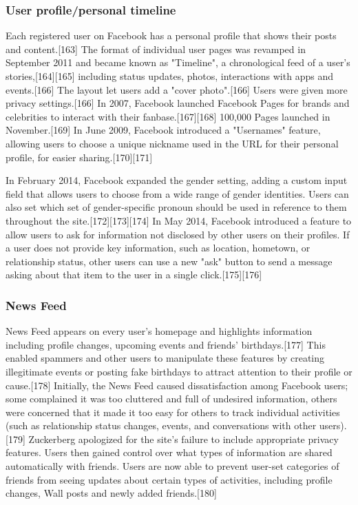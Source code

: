\documentclass[12pt]{article}
\begin{document}
\subsubsection{User profile/personal timeline}



Each registered user on Facebook has a personal profile that shows their posts and content.[163] The format of individual user pages was revamped in September 2011 and became known as "Timeline", a chronological feed of a user's stories,[164][165] including status updates, photos, interactions with apps and events.[166] The layout let users add a "cover photo".[166] Users were given more privacy settings.[166] In 2007, Facebook launched Facebook Pages for brands and celebrities to interact with their fanbase.[167][168] 100,000 Pages launched in November.[169] In June 2009, Facebook introduced a "Usernames" feature, allowing users to choose a unique nickname used in the URL for their personal profile, for easier sharing.[170][171]

In February 2014, Facebook expanded the gender setting, adding a custom input field that allows users to choose from a wide range of gender identities. Users can also set which set of gender-specific pronoun should be used in reference to them throughout the site.[172][173][174] In May 2014, Facebook introduced a feature to allow users to ask for information not disclosed by other users on their profiles. If a user does not provide key information, such as location, hometown, or relationship status, other users can use a new "ask" button to send a message asking about that item to the user in a single click.[175][176] 








\subsubsection{News Feed}



News Feed appears on every user's homepage and highlights information including profile changes, upcoming events and friends' birthdays.[177] This enabled spammers and other users to manipulate these features by creating illegitimate events or posting fake birthdays to attract attention to their profile or cause.[178] Initially, the News Feed caused dissatisfaction among Facebook users; some complained it was too cluttered and full of undesired information, others were concerned that it made it too easy for others to track individual activities (such as relationship status changes, events, and conversations with other users).[179] Zuckerberg apologized for the site's failure to include appropriate privacy features. Users then gained control over what types of information are shared automatically with friends. Users are now able to prevent user-set categories of friends from seeing updates about certain types of activities, including profile changes, Wall posts and newly added friends.[180]
\end{document}
